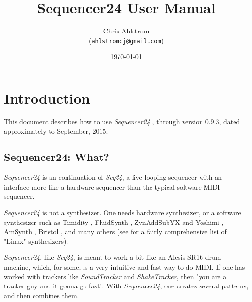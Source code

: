 \documentclass[
 11pt,
 twoside,
 a4paper,
 headinclude,
 footinclude,
 final                                 %
]{article}
\begin{document}
\title{Sequencer24 User Manual}
\author{Chris Ahlstrom\\
   (\texttt{ahlstromcj@gmail.com})}
\date{\today}
\maketitle
\tableofcontents
\listoffigures                         %


\setlength{\parindent}{0pt}
\setlength{\parskip}{1ex plus 0.5ex minus 0.2ex}

\section{Introduction}
\label{sec:introduction}

   This document describes how to use \textsl{Sequencer24} \cite{seq24},
   through version 0.9.3, dated approximately to September, 2015.

\subsection{Sequencer24: What?}
\label{subsec:what_is_seqeuncer24}

   \textsl{Sequencer24} is an continuation of \textsl{Seq24},
   a live-looping sequencer with an interface more like a hardware sequencer
   than the typical software MIDI sequencer.

   \textsl{Sequencer24} is not a synthesizer.  One needs hardware
   synthesizer, or a software synthesizer such as Timidity \cite{timidity},
   FluidSynth \cite{fluidsynth}, ZynAddSubYX \cite{zynaddsubfx} and Yoshimi
   \cite{yoshimi} \cite{yoshimi2}, AmSynth \cite{amsynth}, Bristol
   \cite{bristol}, and many others (see \cite{linuxsynths} for a fairly
   comprehensive list of "Linux" synthesizers).

   \textsl{Sequencer24}, like \textsl{Seq24},
   is meant to work a bit like an Alesis SR16 drum machine,
   which, for some, is a very intuitive and fast way to do MIDI.
   If one has worked with trackers like \textsl{SoundTracker} and
   \textsl{ShakeTracker}, then "you are a tracker guy and it gonna go fast".
   With \textsl{Sequencer24}, one creates several patterns, and then
   combines them.
\end{document}
